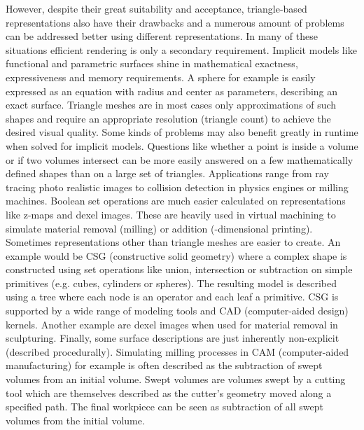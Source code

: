 However, despite their great suitability and acceptance, triangle-based representations also have their drawbacks and a numerous amount of problems can be addressed better using different representations. %
In many of these situations efficient rendering is only a secondary requirement.
Implicit models like functional and parametric surfaces shine in mathematical exactness, expressiveness and memory requirements.
A sphere for example is easily expressed as an equation with radius and center as parameters, describing an exact surface.
Triangle meshes are in most cases only approximations of such shapes and require an appropriate resolution (\ie triangle count) to achieve the desired visual quality.
%
Some kinds of problems may also benefit greatly in runtime when solved for implicit models.
Questions like whether a point is inside a volume or if two volumes intersect can be more easily answered on a few mathematically defined shapes than on a large set of triangles.
Applications range from ray tracing photo realistic images to collision detection in physics engines or milling machines.
Boolean set operations are much easier calculated on representations like z-maps and dexel images.
These are heavily used in virtual machining to simulate material removal (\eg milling) or addition (-dimensional printing).
%
Sometimes representations other than triangle meshes are easier to create.
An example would be CSG (constructive solid geometry) where a complex shape is constructed using set operations like union, intersection or subtraction on simple primitives (e.g. cubes, cylinders or spheres).
The resulting model is described using a tree where each node is an operator and each leaf a primitive.
CSG is supported by a wide range of modeling tools and CAD (computer-aided design) kernels.
Another example are dexel images when used for material removal in sculpturing.
%
Finally, some surface descriptions are just inherently non-explicit (\eg described procedurally).
Simulating milling processes in CAM (computer-aided manufacturing) for example is often described as the subtraction of swept volumes from an initial volume.
Swept volumes are volumes swept by a cutting tool which are themselves described as the cutter's geometry moved along a specified path.
The final workpiece can be seen as subtraction of all swept volumes from the initial volume.


